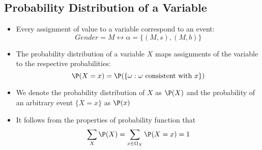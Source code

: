 \subsection{Probability Distribution of a Variable}
	\begin{frame}
		\begin{itemize}
			\item Every assignment of value to a variable correspond to an event:
				\[ {Gender} = M \leftrightarrow \alpha = \{ ( M , s ) , ( M , b ) \} \]
			\item The probability distribution of a variable $X$ maps assignments of the variable to the respective probabilities:
				\[ \P( X = x ) = \P( \{ \omega : \omega \text{ consistent with } x \} ) \]
			\item We denote the probability distribution of $X$ as $\P( X )$ and the probability of an arbitrary event $\{ X = x \}$ as $\P( x )$
			\item It follows from the properties of probability function that
				\[ \sum_X \P( X ) = \sum_{x \in \Omega_X} \P( X = x ) = 1 \]
		\end{itemize}
	\end{frame}